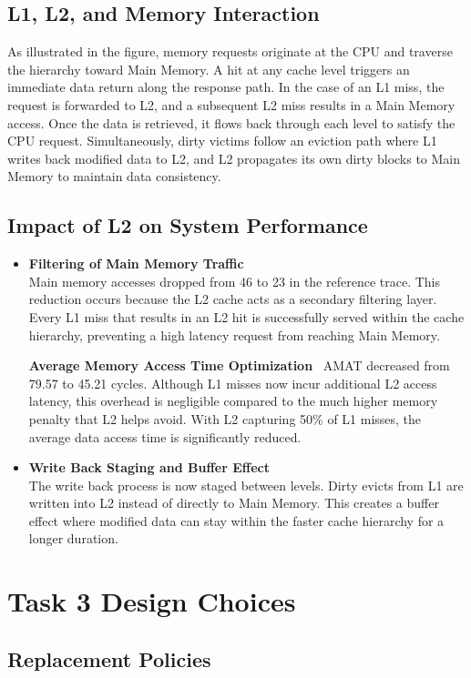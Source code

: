 \documentclass[11pt]{article}
\begin{document}
\subsection{L1, L2, and Memory Interaction}

\noindent As illustrated in the figure, memory requests originate at the CPU and traverse the hierarchy toward Main Memory. A hit at any cache level triggers an immediate data return along the response path. In the case of an L1 miss, the request is forwarded to L2, and a subsequent L2 miss results in a Main Memory access. Once the data is retrieved, it flows back through each level to satisfy the CPU request. Simultaneously, dirty victims follow an eviction path where L1 writes back modified data to L2, and L2 propagates its own dirty blocks to Main Memory to maintain data consistency.
\subsection{Impact of L2 on System Performance}

\begin{itemize}
\item \textbf{Filtering of Main Memory Traffic} \\
Main memory accesses dropped from 46 to 23 in the reference trace. This reduction occurs because the L2 cache acts as a secondary filtering layer. Every L1 miss that results in an L2 hit is successfully served within the cache hierarchy, preventing a high latency request from reaching Main Memory.

\textbf{Average Memory Access Time Optimization} \
AMAT decreased from 79.57 to 45.21 cycles. Although L1 misses now incur additional L2 access latency, this overhead is negligible compared to the much higher memory penalty that L2 helps avoid. With L2 capturing 50\% of L1 misses, the average data access time is significantly reduced.
\item \textbf{Write Back Staging and Buffer Effect} \\
The write back process is now staged between levels. Dirty evicts from L1 are written into L2 instead of directly to Main Memory. This creates a buffer effect where modified data can stay within the faster cache hierarchy for a longer duration.
\end{itemize}
\section{Task 3 Design Choices}

\subsection{Replacement Policies}
\end{document}
